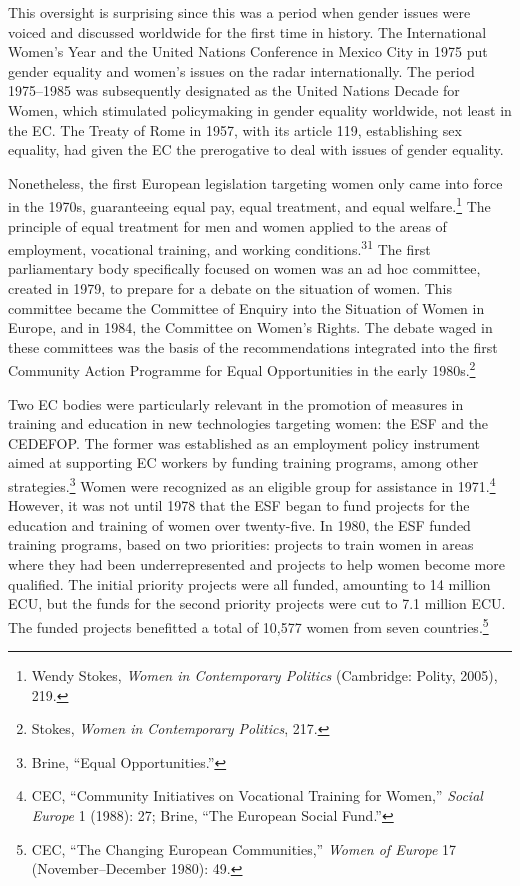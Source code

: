 \documentclass{tufte-handout}
\begin{document}
This oversight is surprising since this was a period when gender issues
were voiced and discussed worldwide for the first time in history. The
International Women's Year and the United Nations Conference in Mexico
City in 1975 put gender equality and women's issues on the radar
internationally. The period 1975--1985 was subsequently designated as
the United Nations Decade for Women, which stimulated policymaking in
gender equality worldwide, not least in the EC. The Treaty of Rome in
1957, with its article 119, establishing sex equality, had given the EC
the prerogative to deal with issues of gender equality.

Nonetheless, the first European legislation targeting women only came
into force in the 1970s, guaranteeing equal pay, equal treatment, and
equal welfare.\footnote{Wendy Stokes, \emph{Women in Contemporary
  Politics} (Cambridge: Polity, 2005), 219.} The principle of equal
treatment for men and women applied to the areas of employment,
vocational training, and working conditions.\textsuperscript{31} The first parliamentary body specifically focused on women
was an ad hoc committee, created in 1979, to prepare for a debate on the
situation of women. This committee became the Committee of Enquiry into
the Situation of Women in Europe, and in 1984, the Committee on Women's
Rights. The debate waged in these committees was the basis of the
recommendations integrated into the first Community Action Programme for
Equal Opportunities in the early 1980s.\footnote{Stokes, \emph{Women in
  Contemporary Politics}, 217.}

Two EC bodies were particularly relevant in the promotion of measures in
training and education in new technologies targeting women: the ESF and
the CEDEFOP. The former was established as an employment policy
instrument aimed at supporting EC workers by funding training programs,
among other strategies.\footnote{Brine, ``Equal Opportunities.''} Women
were recognized as an eligible group for assistance in 1971.\footnote{CEC,
  ``Community Initiatives on Vocational Training for Women,''
  \emph{Social Europe} 1 (1988): 27; Brine, ``The European Social
  Fund.''} However, it was not until 1978 that the ESF began to fund
projects for the education and training of women over twenty-five. In
1980, the ESF funded training programs, based on two priorities:
projects to train women in areas where they had been underrepresented
and projects to help women become more qualified. The initial priority
projects were all funded, amounting to 14 million ECU, but the funds for
the second priority projects were cut to 7.1 million ECU. The funded
projects benefitted a total of 10,577 women from seven
countries.\footnote{CEC, ``The Changing European Communities,''
  \emph{Women of Europe} 17 (November--December 1980): 49.}
\end{document}
